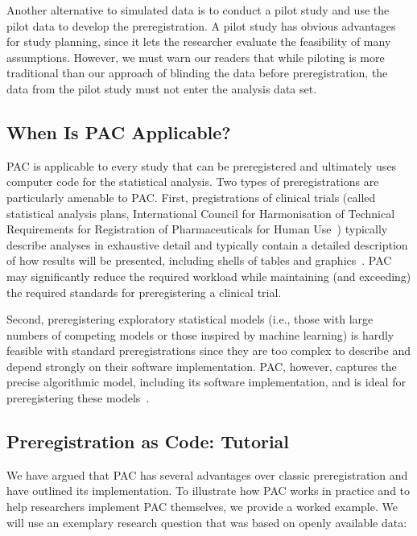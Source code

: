 \documentclass[psych,tutorial,accept,moreauthors,pdftex]{Definitions/mdpi}
\begin{document}
\begin{paracol}{2}
Another alternative to simulated data is to conduct a pilot study
\citep{thabaneTutorialPilotStudies2010} and use the pilot data to
develop the preregistration. A pilot study has obvious advantages for
study planning, since it lets the researcher evaluate the feasibility of
many assumptions. However, we must warn our readers that while piloting
is more traditional than our approach of blinding the data before
preregistration, the data from the pilot study must not enter the
analysis data set.

\subsection{When Is PAC Applicable?}\label{when-is-pac-applicable}

PAC is applicable to every study that can be preregistered and
ultimately uses computer code for the statistical analysis. Two types of
preregistrations are particularly amenable to PAC. First, pregistrations
of clinical trials (called statistical analysis plans, International Council for Harmonisation of Technical Requirements for Registration of
Pharmaceuticals for Human Use~\citep{ICH1998})
typically describe analyses in exhaustive detail and typically contain a
detailed description of how results will be presented, including shells
of tables and graphics~\citep{yuanGuideStatisticalAnalysis2019}. PAC may
significantly reduce the required workload while maintaining (and
exceeding) the required standards for preregistering a clinical trial.

Second, preregistering exploratory statistical models (i.e., those with
large numbers of competing models or those inspired by machine learning)
is hardly feasible with standard preregistrations since they are too
complex to describe and depend strongly on their software
implementation. PAC, however, captures the precise algorithmic model,
including its software implementation, and is ideal for preregistering
these models~\citep{brandmaier22mlsem}.

\subsection{Preregistration as Code:
Tutorial}\label{preregistration-as-code-tutorial}

We have argued that PAC has several advantages over classic
preregistration and have outlined its implementation. To illustrate how
PAC works in practice and to help researchers implement PAC themselves,
we provide a worked example. We will use an exemplary research question
that was based on openly available data:


\end{paracol}
\end{document}
